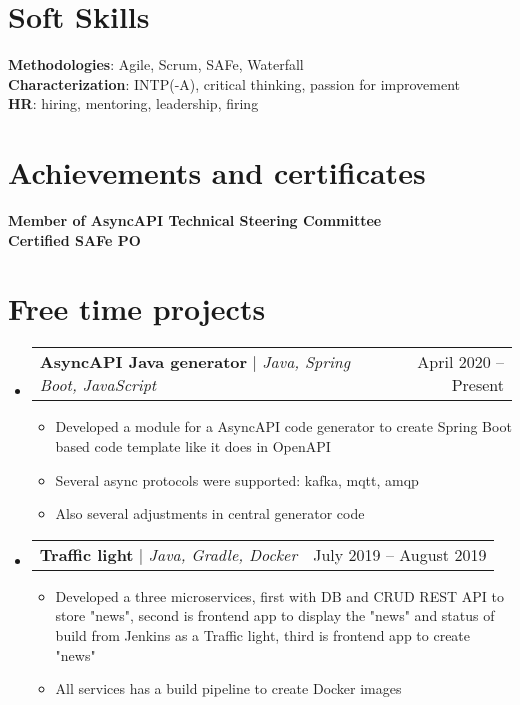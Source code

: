 \documentclass[letterpaper,11pt]{article}
\makeatletter
\newcommand{\resumeItem}[1]{
  \item\small{
    {#1 \vspace{-2pt}}
  }
}
\newcommand{\resumeProjectHeading}[2]{
    \item
    \begin{tabular*}{0.97\textwidth}{l@{\extracolsep{\fill}}r}
      \small#1 & #2 \\
    \end{tabular*}\vspace{-7pt}
}
\newcommand{\resumeSubHeadingListStart}{\begin{itemize}[leftmargin=0.15in, label={}]}
\newcommand{\resumeSubHeadingListEnd}{\end{itemize}}
\newcommand{\resumeItemListStart}{\begin{itemize}}
\newcommand{\resumeItemListEnd}{\end{itemize}\vspace{-5pt}}
\makeatother
\begin{document}
\section{Soft Skills}
 \begin{itemize}[leftmargin=0.15in, label={}]
    \small{\item{
     \textbf{Methodologies}{: Agile, Scrum, SAFe, Waterfall} \\
     \textbf{Characterization}{: INTP(-A), critical thinking, passion for improvement} \\
     \textbf{HR}{: hiring, mentoring, leadership, firing}
    }}
 \end{itemize}

\section{Achievements and certificates}
 \begin{itemize}[leftmargin=0.15in, label={}]
    \small{\item{
     \textbf{Member of AsyncAPI Technical Steering Committee}{} \\
     \textbf{Certified SAFe PO}{}
    }}
 \end{itemize}



\section{Free time projects}
    \resumeSubHeadingListStart
      \resumeProjectHeading
          {\textbf{AsyncAPI Java generator} $|$ \emph{Java, Spring Boot, JavaScript}}{April 2020 -- Present}
          \resumeItemListStart
            \resumeItem{Developed a module for a AsyncAPI code generator to create Spring Boot based code template like it does in OpenAPI}
            \resumeItem{Several async protocols were supported: kafka, mqtt, amqp}
            \resumeItem{Also several adjustments in central generator code}
          \resumeItemListEnd
      \resumeProjectHeading
          {\textbf{Traffic light} $|$ \emph{Java, Gradle, Docker}}{July 2019 -- August 2019}
          \resumeItemListStart
            \resumeItem{Developed a three microservices, first with DB and CRUD REST API to store "news", second is frontend app to display the "news" and status of build from Jenkins as a Traffic light, third is frontend app to create "news"}
            \resumeItem{All services has a build pipeline to create Docker images}
          \resumeItemListEnd
    \resumeSubHeadingListEnd
\end{document}
